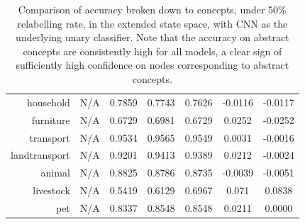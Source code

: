 \documentclass[11pt,a4paper]{book}
\begin{document}
\begin{table}[htbp]
\begin{tabular}{r|c|c|c|c|c|c}
household     & N/A    & 0.7859 & 0.7743 & 0.7626 & -0.0116 & -0.0117\\
furniture     & N/A    & 0.6729 & 0.6981 & 0.6729 & 0.0252 & -0.0252\\
transport     & N/A    & 0.9534 & 0.9565 & 0.9549 & 0.0031 & -0.0016\\
landtransport & N/A    & 0.9201 & 0.9413 & 0.9389 & 0.0212 & -0.0024\\
animal        & N/A    & 0.8825 & 0.8786 & 0.8735 & -0.0039 & -0.0051\\
livestock     & N/A    & 0.5419 & 0.6129 & 0.6967 & 0.071 & 0.0838\\
pet           & N/A    & 0.8337 & 0.8548 & 0.8548 & 0.0211 & 0.0000
\end{tabular}
\caption{Comparison of accuracy broken down to concepts, under 50\% relabelling rate, in the extended state space, with CNN as the underlying unary classifier. Note that the accuracy on abstract concepts are consistently high for all models, a clear sign of sufficiently high confidence on nodes corresponding to abstract concepts.}
\label{tab:cnn50acc}
\end{table}
\end{document}
